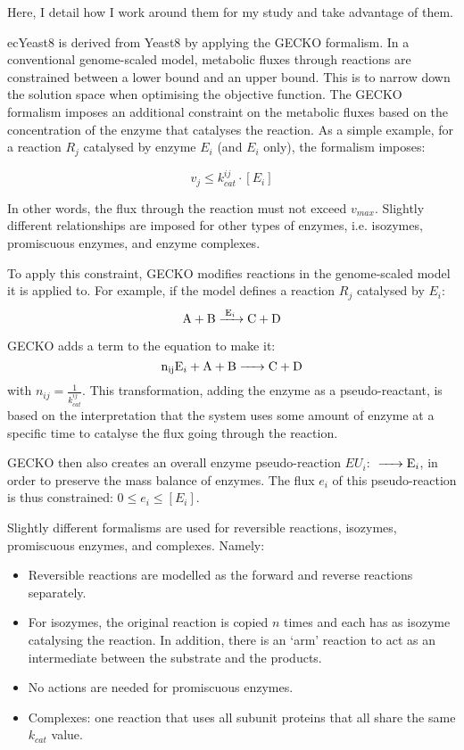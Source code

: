 Here, I detail how I work around them for my study and take advantage of them.


ecYeast8 is derived from Yeast8 by applying the GECKO formalism.
In a conventional genome-scaled model, metabolic fluxes through reactions are constrained between a lower bound and an upper bound.
This is to narrow down the solution space when optimising the objective function.
The GECKO formalism imposes an additional constraint on the metabolic fluxes based on the concentration of the enzyme that catalyses the reaction.
As a simple example, for a reaction $R_{j}$ catalysed by enzyme $E_{i}$ (and $E_{i}$ only), the formalism imposes:

\begin{equation}
  v_{j} \le k_{cat}^{ij} \cdot [E_{i}]
\end{equation}

In other words, the flux through the reaction must not exceed $v_{max}$.
Slightly different relationships are imposed for other types of enzymes, i.e. isozymes, promiscuous enzymes, and enzyme complexes.

To apply this constraint, GECKO modifies reactions in the genome-scaled model it is applied to.
For example, if the model defines a reaction $R_{j}$ catalysed by $E_{i}$:
\begin{equation}
  \ce{ A + B ->[E_{i}] C + D }
\end{equation}

GECKO adds a term to the equation to make it:
\begin{equation}
  \ce{ n_{ij}E_{i} + A + B -> C + D }
\end{equation}
with $n_{ij} = \frac{1}{k_{cat}^{ij}}$.
This transformation, adding the enzyme as a pseudo-reactant, is based on the interpretation that the system uses some amount of enzyme at a specific time to catalyse the flux going through the reaction.

GECKO then also creates an overall enzyme pseudo-reaction $EU_{i}$: $\ce{ -> E_{i}}$, in order to preserve the mass balance of enzymes.  The flux $e_{i}$ of this pseudo-reaction is thus constrained: $0 \le e_{i} \le [E_{i}]$.

Slightly different formalisms are used for reversible reactions, isozymes, promiscuous enzymes, and complexes.  Namely:
\begin{itemize}
  \item Reversible reactions are modelled as the forward and reverse reactions separately.
  \item For isozymes, the original reaction is copied $n$ times and each has as isozyme catalysing the reaction.
  In addition, there is an `arm' reaction to act as an intermediate between the substrate and the products.
  \item No actions are needed for promiscuous enzymes.
  \item Complexes: one reaction that uses all subunit proteins that all share the same $k_{cat}$ value.
\end{itemize}

